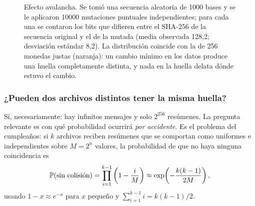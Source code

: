 \begin{figure}[t]
\centering
{}
\caption[Efecto avalancha de SHA-256]{Efecto avalancha. Se tomó una secuencia aleatoria de 1000 bases y se le aplicaron \num{10000} mutaciones puntuales independientes; para cada una se contaron los bits que difieren entre el SHA-256 de la secuencia original y el de la mutada (media observada 128,2; desviación estándar 8,2). La distribución coincide con la de 256 monedas justas (naranja): un cambio mínimo en los datos produce una huella completamente distinta, y nada en la huella delata dónde estuvo el cambio.}
\label{fig:00-avalancha}
\end{figure}

\subsubsection{¿Pueden dos archivos distintos tener la misma huella?}

Sí, necesariamente: hay infinitos mensajes y solo $2^{256}$ resúmenes. La pregunta relevante es con qué probabilidad ocurrirá \emph{por accidente}. Es el problema del cumpleaños: si $k$ archivos reciben resúmenes que se comportan como uniformes e independientes sobre $M=2^n$ valores, la probabilidad de que no haya ninguna coincidencia es
\begin{equation}\label{eq:00-cumple}
\mathbb{P}(\text{sin colisión}) = \prod_{i=1}^{k-1}\left(1-\frac{i}{M}\right) \approx \exp\!\left(-\frac{k(k-1)}{2M}\right),
\end{equation}
usando $1-x\approx e^{-x}$ para $x$ pequeño y $\sum_{i=1}^{k-1} i = k(k-1)/2$.

\begin{simbolos}
\end{simbolos}


